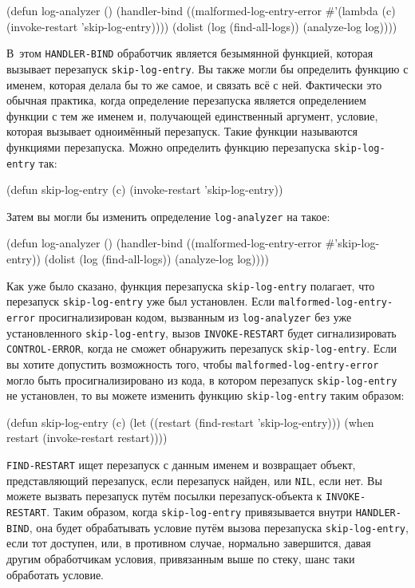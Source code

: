 \begin{myverb}
(defun log-analyzer ()
  (handler-bind ((malformed-log-entry-error
                  #'(lambda (c)
                      (invoke-restart 'skip-log-entry))))
    (dolist (log (find-all-logs))
      (analyze-log log))))
\end{myverb}

В~этом \lstinline{HANDLER-BIND} обработчик является безымянной функцией, которая вызывает
перезапуск \lstinline{skip-log-entry}. Вы также могли бы определить функцию с именем, которая
делала бы то же самое, и связать всё с ней. Фактически это обычная практика, когда
определение перезапуска является определением функции с тем же именем и, получающей
единственный аргумент, условие, которая вызывает одноимённый перезапуск. Такие функции
называются функциями перезапуска. Можно определить функцию перезапуска
\lstinline{skip-log-entry} так:

\begin{myverb}
(defun skip-log-entry (c)
  (invoke-restart 'skip-log-entry))
\end{myverb}

Затем вы могли бы изменить определение \lstinline{log-analyzer} на такое:

\begin{myverb}
(defun log-analyzer ()
  (handler-bind ((malformed-log-entry-error #'skip-log-entry))
    (dolist (log (find-all-logs))
      (analyze-log log))))
\end{myverb}

Как уже было сказано, функция перезапуска \lstinline{skip-log-entry} полагает, что перезапуск
\lstinline{skip-log-entry} уже был установлен. Если \lstinline{malformed-log-entry-error}
просигнализирован кодом, вызванным из \lstinline{log-analyzer} без уже установленного
\lstinline{skip-log-entry}, вызов \lstinline{INVOKE-RESTART} будет сигнализировать
\lstinline{CONTROL-ERROR}, когда не сможет обнаружить перезапуск \lstinline{skip-log-entry}. Если вы
хотите допустить возможность того, чтобы \lstinline{malformed-log-entry-error} могло быть
просигнализировано из кода, в котором перезапуск \lstinline{skip-log-entry} не установлен, то вы
можете изменить функцию \lstinline{skip-log-entry} таким образом:

\begin{myverb}
(defun skip-log-entry (c)
  (let ((restart (find-restart 'skip-log-entry)))
    (when restart (invoke-restart restart))))
\end{myverb}

\lstinline{FIND-RESTART} ищет перезапуск с данным именем и возвращает объект, представ\-ляю\-щий
перезапуск, если перезапуск найден, или \lstinline{NIL}, если нет. Вы можете вызвать перезапуск
путём посылки перезапуск-объекта к \lstinline{INVOKE-RESTART}. Таким образом, когда
\lstinline{skip-log-entry} привязывается внутри \lstinline{HANDLER-BIND}, она будет обрабатывать
условие путём вызова перезапуска \lstinline{skip-log-entry}, если тот доступен, или, в противном
случае, нормально завершится, давая другим обработчикам условия, привязанным выше по
стеку, шанс таки обработать условие.

